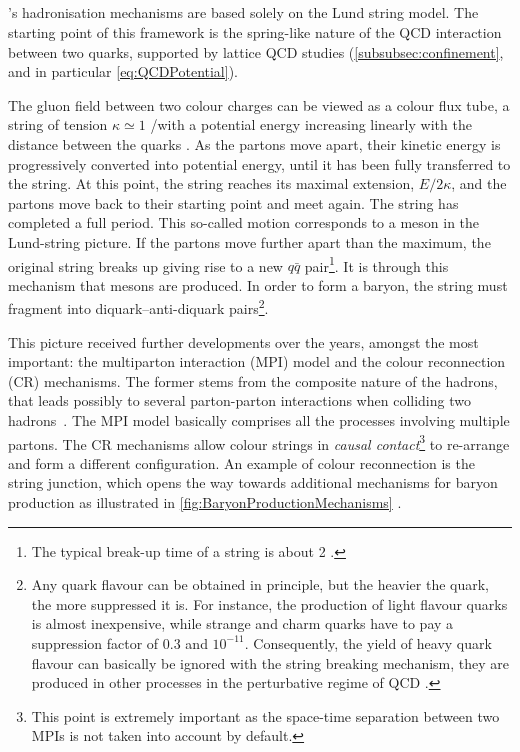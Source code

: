 \subsection{\Pythia}

\Pythia's hadronisation mechanisms are based solely on the Lund string model. The starting point of this framework is the spring-like nature of the QCD interaction between two quarks, supported by lattice QCD studies (\Sec\ref{subsubsec:confinement}, and in particular \eq\ref{eq:QCDPotential}). 

The gluon field between two colour charges can be viewed as a colour flux tube, a string of tension $\kappa \simeq 1$ \gev/\fm with a potential energy increasing linearly with the distance between the quarks \cite{bierlichComprehensiveGuidePhysics2022}. As the partons move apart, their kinetic energy is progressively converted into potential energy, until it has been fully transferred to the string. At this point, the string reaches its maximal extension, $E/2\kappa$, and the partons move back to their starting point and meet again. The string has completed a full period. This so-called  motion corresponds to a meson in the Lund-string picture. If the partons move further apart than the maximum, the original string breaks up giving rise to a new $q \bar{q}$ pair\footnote{The typical break-up time of a string is about 2 \fmC \cite{bierlichComprehensiveGuidePhysics2022}.}. It is through this mechanism that mesons are produced. In order to form a baryon, the string must fragment into diquark--anti-diquark pairs\footnote{Any quark flavour can be obtained in principle, but the heavier the quark, the more suppressed it is. For instance, the production of light flavour quarks is almost inexpensive, while strange and charm quarks have to pay a suppression factor of $0.3$ and $10^{-11}$. Consequently, the yield of heavy quark flavour can basically be ignored with the string breaking mechanism, they are produced in other processes in the perturbative regime of QCD \cite{sjostrandIntroductionPYTHIA2015}.}. 

This picture received further developments over the years, amongst the most important: the multiparton interaction (MPI) model and the colour reconnection (CR) mechanisms. The former stems from the composite nature of the hadrons, that leads possibly to several parton-parton interactions when colliding two hadrons~\cite{sjostrandDevelopmentMPIModelling2017}. The MPI model basically comprises all the processes involving multiple partons. The CR mechanisms allow colour strings in \textit{causal contact}\footnote{This point is extremely important as the space-time separation between two MPIs is not taken into account by default.} to re-arrange and form a different configuration. An example of colour reconnection is the string junction, which opens the way towards additional mechanisms for baryon production as illustrated in \fig\ref{fig:BaryonProductionMechanisms} \cite{heleniusRecentPythiaDevelopments2016}.\\

